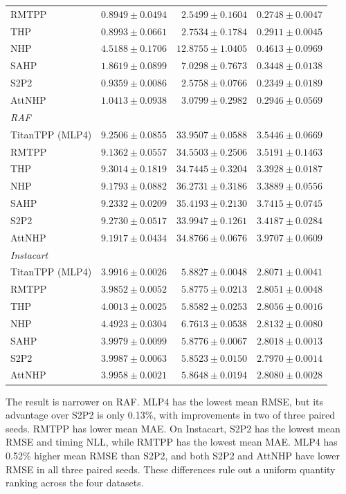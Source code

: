 \documentclass[runningheads]{llncs}
\begin{document}
\begin{table}[p]
\begin{tabular}{lrrr}
RMTPP & $0.8949\pm0.0494$ & $2.5499\pm0.1604$ & $0.2748\pm0.0047$\\
THP & $0.8993\pm0.0661$ & $2.7534\pm0.1784$ & $0.2911\pm0.0045$\\
NHP & $4.5188\pm0.1706$ & $12.8755\pm1.0405$ & $0.4613\pm0.0969$\\
SAHP & $1.8619\pm0.0899$ & $7.0298\pm0.7673$ & $0.3448\pm0.0138$\\
S2P2 & $0.9359\pm0.0086$ & $2.5758\pm0.0766$ & $\mathbf{0.2349\pm0.0189}$\\
AttNHP & $1.0413\pm0.0938$ & $3.0799\pm0.2982$ & $0.2946\pm0.0569$\\
\midrule
\multicolumn{4}{l}{\textit{RAF}}\\
TitanTPP (MLP4) & $9.2506\pm0.0855$ & $\mathbf{33.9507\pm0.0588}$ & $3.5446\pm0.0669$\\
RMTPP & $\mathbf{9.1362\pm0.0557}$ & $34.5503\pm0.2506$ & $3.5191\pm0.1463$\\
THP & $9.3014\pm0.1819$ & $34.7445\pm0.3204$ & $3.3928\pm0.0187$\\
NHP & $9.1793\pm0.0882$ & $36.2731\pm0.3186$ & $\mathbf{3.3889\pm0.0556}$\\
SAHP & $9.2332\pm0.0209$ & $35.4193\pm0.2130$ & $3.7415\pm0.0745$\\
S2P2 & $9.2730\pm0.0517$ & $33.9947\pm0.1261$ & $3.4187\pm0.0284$\\
AttNHP & $9.1917\pm0.0434$ & $34.8766\pm0.0676$ & $3.9707\pm0.0609$\\
\midrule
\multicolumn{4}{l}{\textit{Instacart}}\\
TitanTPP (MLP4) & $3.9916\pm0.0026$ & $5.8827\pm0.0048$ & $2.8071\pm0.0041$\\
RMTPP & $\mathbf{3.9852\pm0.0052}$ & $5.8775\pm0.0213$ & $2.8051\pm0.0048$\\
THP & $4.0013\pm0.0025$ & $5.8582\pm0.0253$ & $2.8056\pm0.0016$\\
NHP & $4.4923\pm0.0304$ & $6.7613\pm0.0538$ & $2.8132\pm0.0080$\\
SAHP & $3.9979\pm0.0099$ & $5.8776\pm0.0067$ & $2.8018\pm0.0013$\\
S2P2 & $3.9987\pm0.0063$ & $\mathbf{5.8523\pm0.0150}$ & $\mathbf{2.7970\pm0.0014}$\\
AttNHP & $3.9958\pm0.0021$ & $5.8648\pm0.0194$ & $2.8080\pm0.0028$\\
\bottomrule
\end{tabular}
\end{table}

The result is narrower on RAF. MLP4 has the lowest mean RMSE, but its advantage over S2P2 is only 0.13\%, with improvements in two of three paired seeds. RMTPP has lower mean MAE. On Instacart, S2P2 has the lowest mean RMSE and timing NLL, while RMTPP has the lowest mean MAE. MLP4 has 0.52\% higher mean RMSE than S2P2, and both S2P2 and AttNHP have lower RMSE in all three paired seeds. These differences rule out a uniform quantity ranking across the four datasets.
\end{document}
